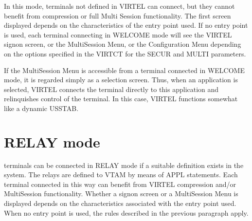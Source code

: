 \documentclass[letterpaper,10pt,english]{sphinxmanual}
\begin{document}
\sphinxAtStartPar
In this mode, terminals not defined in VIRTEL can connect, but they cannot benefit from compression or full Multi\sphinxhyphen{}
Session functionality. The first screen displayed depends on the characteristics of the entry point used. If no entry
point is used, each terminal connecting in WELCOME mode will see the VIRTEL sign\sphinxhyphen{}on screen, or the Multi\sphinxhyphen{}Session
Menu, or the Configuration Menu depending on the options specified in the VIRTCT for the SECUR and MULTI
parameters.

\sphinxAtStartPar
If the Multi\sphinxhyphen{}Session Menu is accessible from a terminal connected in WELCOME mode, it is regarded simply as a
selection screen. Thus, when an application is selected, VIRTEL connects the terminal directly to this application and
relinquishes control of the terminal. In this case, VIRTEL functions somewhat like a dynamic USSTAB.

\ignorespaces 

\section{RELAY mode}
\label{\detokenize{connectivity_guide:relay-mode}}\label{\detokenize{connectivity_guide:index-137}}
 terminals can be connected in RELAY mode if a suitable definition exists in the system. The relays are defined to VTAM by means of APPL statements. Each terminal connected in this way can benefit from VIRTEL compression and/or Multi\sphinxhyphen{}Session functionality. Whether a sign\sphinxhyphen{}on screen or a Multi\sphinxhyphen{}Session Menu is displayed depends on the characteristics associated with the entry point used. When no entry point is used, the rules described in the previous paragraph apply.

\ignorespaces 
\end{document}
